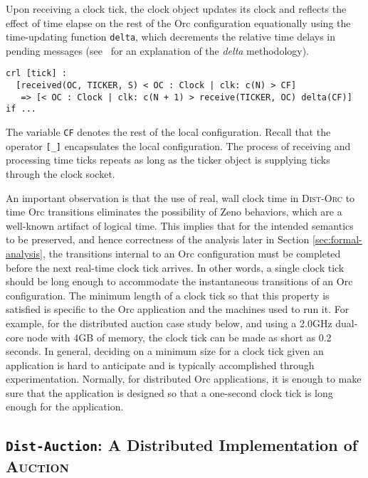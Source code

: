 \documentclass{eptcs}
\begin{document}
Upon receiving a clock tick, the clock object updates its clock and reflects the effect of time elapse on the rest of the Orc configuration equationally using the time-updating function \texttt{delta}, which decrements the relative time delays in pending messages (see~\cite{journ-rtm} for an explanation of the \emph{delta} methodology). 

\begin{small}
\begin{verbatim}
crl [tick] : 
  [received(OC, TICKER, S) < OC : Clock | clk: c(N) > CF]
   => [< OC : Clock | clk: c(N + 1) > receive(TICKER, OC) delta(CF)]  if ...
\end{verbatim}
\end{small}

\noindent The variable \texttt{CF} denotes the rest of the local configuration. Recall that the operator \texttt{[\_]} encapsulates the local configuration. The process of receiving and processing time ticks repeats as long as the ticker object is supplying ticks through the clock socket.


An important observation is that the use of real, wall clock time in \textsc{Dist-Orc} to time Orc transitions eliminates the possibility of Zeno behaviors, which are a well-known artifact of logical time. This implies that for the intended semantics to be preserved, and hence correctness of the analysis later in Section \ref{sec:formal-analysis}, the transitions internal to an Orc configuration must be completed before the next real-time clock tick arrives. In other words, a single clock tick should be long enough to accommodate the instantaneous transitions of an Orc configuration. The minimum length of a clock tick so that this property is satisfied is specific  to the Orc application and the machines used to run it. For example, for the distributed auction case study below, and using a 2.0GHz dual-core node with 4GB of memory, the clock tick can be made as short as 0.2 seconds. In general, deciding on a minimum size for a clock tick given an application is hard to anticipate and is typically accomplished through experimentation. Normally, for distributed Orc applications, it is enough to make sure that the application is designed so that a one-second clock tick is long enough for the application.


\subsection{\texttt{Dist-Auction}: A Distributed Implementation of \textsc{Auction}} \label{sec:auction-example}
\end{document}
